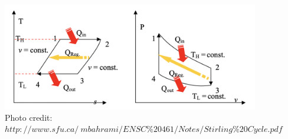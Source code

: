 \documentclass[11pt,a4paper]{article}
\begin{document}
\begin{figure}[h!]
\begin{center}
\includegraphics[scale=0.5]{rys3.png}
\caption{Photo credit: $http://www.sfu.ca/~mbahrami/ENSC\%20461/Notes/Stirling\%20Cycle.pdf$}
\end{center}
\end{figure}
\end{document}
